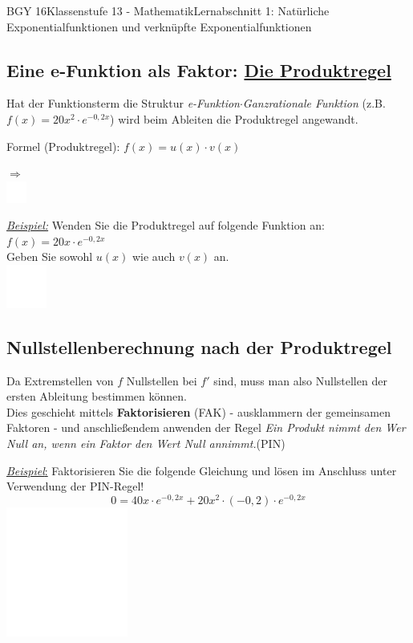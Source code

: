 \documentclass[11pt,twocolumn,oneside,openany,headings=optiontotoc,11pt,numbers=noenddot]{article}
\begin{document}
\begin{worksheet}{BGY 16}{Klassenstufe 13 - Mathematik}{Lernabschnitt 1: Natürliche Exponentialfunktionen und verknüpfte Exponentialfunktionen}
		\subsection{Eine e-Funktion als Faktor: \underline{Die Produktregel}}
		Hat der Funktionsterm die Struktur \glqq{}\textit{e-Funktion$\cdot$Ganzrationale Funktion}\grqq{} (z.B. \(f(x) = 20x^2\cdot{}e^{-0,2x}\)) wird beim Ableiten die Produktregel angewandt.\\
		\par\noindent
		\begin{framed}
			\noindent
			Formel (\small{Produktregel}\normalsize): \(f(x) = u(x)\cdot{}v(x)\)\\
			\par\noindent
			$\Rightarrow$\\
			\includegraphics[width=0.05\textwidth]{../../empty.jpg}
		\end{framed}
		\noindent
		\underline{\textit{Beispiel:}} Wenden Sie die Produktregel auf folgende Funktion an: \(f(x) = 20x\cdot{}e^{-0,2x}\)\\
		Geben Sie sowohl \(u(x)\) wie auch \(v(x)\) an.\\
		\includegraphics[width=0.1\textwidth]{../../empty.jpg}
		\subsection{Nullstellenberechnung nach der Produktregel}
		Da Extremstellen von \(f\) Nullstellen bei \(f'\) sind, muss man also Nullstellen der ersten Ableitung bestimmen können.\\
		Dies geschieht mittels \textbf{Faktorisieren} (FAK) - ausklammern der gemeinsamen Faktoren - und anschließendem anwenden der Regel \grqq{}\textit{Ein Produkt nimmt den Wer Null an, wenn ein Faktor den Wert Null annimmt.}\grqq{}(PIN)\\
		\par\noindent
		\underline{\textit{Beispiel}:} Faktorisieren Sie die folgende Gleichung und lösen im Anschluss unter Verwendung der PIN-Regel!
		\[0 = 40x\cdot{}e^{-0,2x} + 20x^2\cdot(-0,2)\cdot{}e^{-0,2x}\]
		\includegraphics[width=0.3\textwidth]{../../empty.jpg}

\end{worksheet}
\end{document}
